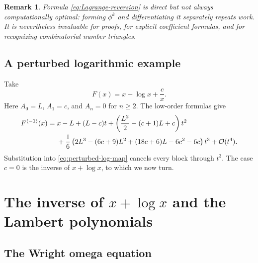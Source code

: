 \documentclass[11pt]{article}
\theoremstyle{pltheorem}
\newtheorem{remark}[theorem]{Remark}
\newcommand{\bigO}{\mathcal O}
\newcommand{\rev}{\langle-1\rangle}
\begin{document}
\begin{remark}
Formula \cref{eq:Lagrange-reversion} is direct but not always computationally optimal: forming \(\phi^k\) and differentiating it separately repeats work.  It is nevertheless invaluable for proofs, for explicit coefficient formulas, and for recognizing combinatorial number triangles.
\end{remark}

\subsection{A perturbed logarithmic example}

Take
\begin{equation}\label{eq:perturbed-log-map}
 F(x)=x+\log x+\frac{c}{x}.
\end{equation}
Here \(A_0=L\), \(A_1=c\), and \(A_n=0\) for \(n\ge2\).  The low-order formulas give
\begin{align}
 F^{\rev}(x)={}&x-L+(L-c)t
 +\left(\frac{L^2}{2}-(c+1)L+c\right)t^2
 \notag\\
 &+\frac{1}{6}\left(2L^3-(6c+9)L^2+(18c+6)L-6c^2-6c\right)t^3
 +\bigO(t^4).
 \label{eq:perturbed-log-inverse}
\end{align}
Substitution into \cref{eq:perturbed-log-map} cancels every block through \(t^3\).  The case \(c=0\) is the inverse of \(x+\log x\), to which we now turn.

\section{\texorpdfstring{The inverse of \(x+\log x\) and the Lambert polynomials}{The inverse of x + log x and the Lambert polynomials}}
\label{sec:Lambert-polynomials}

\subsection{The Wright omega equation}
\end{document}
